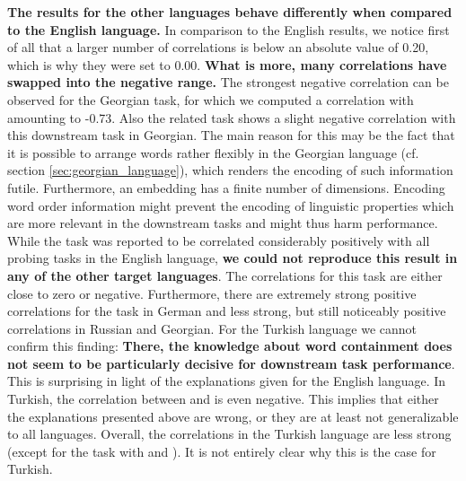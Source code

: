 \textbf{The results for the other languages behave differently when compared to the English language.} In comparison to the English results, we notice first of all that a larger number of correlations is below an absolute value of 0.20, which is why they were set to 0.00. \textbf{What is more, many correlations have swapped into the negative range.} The strongest negative correlation can be observed for the Georgian  task, for which we computed a correlation with  amounting to -0.73. Also the related  task shows a slight negative correlation with this downstream task in Georgian. The main reason for this may be the fact that it is possible to arrange words rather flexibly in the Georgian language (cf. section \vref{sec:georgian_language}), which renders the encoding of such information futile. Furthermore, an embedding has a finite number of dimensions. Encoding word order information might prevent the encoding of linguistic properties which are more relevant in the downstream tasks and might thus harm performance. While the  task was reported to be correlated considerably positively with all probing tasks in the English language, \textbf{we could not reproduce this result in any of the other target languages}. The correlations for this task are either close to zero or negative. Furthermore, there are extremely strong positive correlations for the  task in German and less strong, but still noticeably positive correlations in Russian and Georgian. For the Turkish language we cannot confirm this finding: \textbf{There, the knowledge about word containment does not seem to be particularly decisive for downstream task performance}. This is surprising in light of the explanations given for the English language. In Turkish, the correlation between  and  is even negative. This implies that either the explanations presented above are wrong, or they are at least not generalizable to all languages. Overall, the correlations in the Turkish language are less strong (except for the  task with  and ). It is not entirely clear why this is the case for Turkish. 


